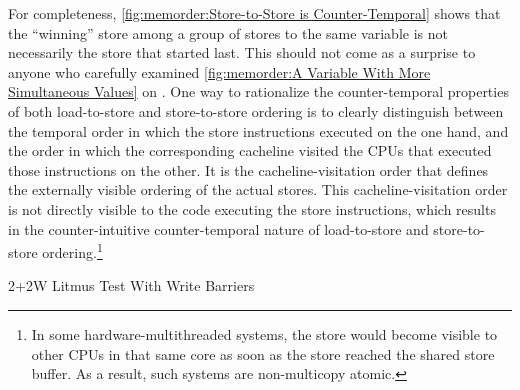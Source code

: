 For completeness,
\cref{fig:memorder:Store-to-Store is Counter-Temporal}
shows that the ``winning'' store among a group of stores to the
same variable is not necessarily the store that started last.
This should not come as a surprise to anyone who carefully examined
\cref{fig:memorder:A Variable With More Simultaneous Values}
on
.
One way to rationalize the counter-temporal properties of both
load-to-store and store-to-store ordering is to clearly distinguish
between the temporal order in which the store instructions executed on
the one hand, and the order in which the corresponding cacheline visited
the CPUs that executed those instructions on the other.
It is the cacheline-visitation order that defines the externally
visible ordering of the actual stores.
This cacheline-visitation order is not directly visible to the code
executing the store instructions, which results in the counter-intuitive
counter-temporal nature of load-to-store and store-to-store ordering.\footnote{
	In some hardware-multithreaded systems, the store would become
	visible to other CPUs in that same core as soon as the store
	reached the shared store buffer.
	As a result, such systems are non-multicopy atomic.}

\begin{listing}

\caption{2+2W Litmus Test With Write Barriers}
\label{lst:memorder:2+2W Litmus Test With Write Barriers}
\end{listing}

